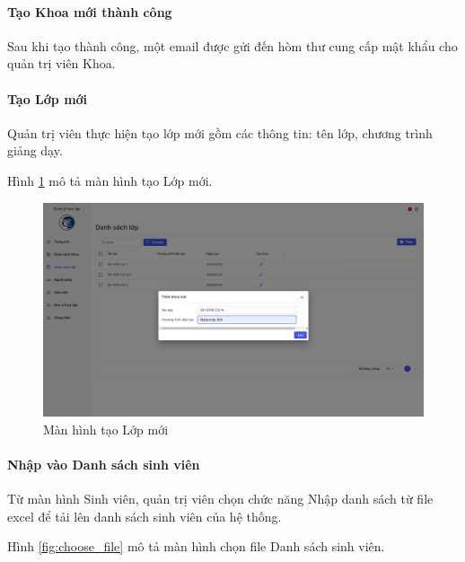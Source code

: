 \documentclass[./../main.tex]{subfiles}
\begin{document}
\paragraph*{Tạo Khoa mới thành công}

Sau khi tạo thành công, một email được gửi đến hòm thư cung cấp mật khẩu cho quản trị viên Khoa.


\paragraph*{Tạo Lớp mới}

Quản trị viên thực hiện tạo lớp mới gồm các thông tin: tên lớp, chương trình giảng dạy.

Hình \ref{fig:add_class} mô tả màn hình tạo Lớp mới.

\begin{figure}[]
	\includegraphics[width=\linewidth]{./images/image25.png}
	\caption{Màn hình tạo Lớp mới}
	\label{fig:add_class}
\end{figure}

\paragraph*{Nhập vào Danh sách sinh viên}

Từ màn hình Sinh viên, quản trị viên chọn chức năng Nhập danh sách từ file excel để tải lên danh sách sinh viên của hệ thống.

Hình \ref{fig:choose_file} mô tả màn hình chọn file Danh sách sinh viên.
\end{document}
